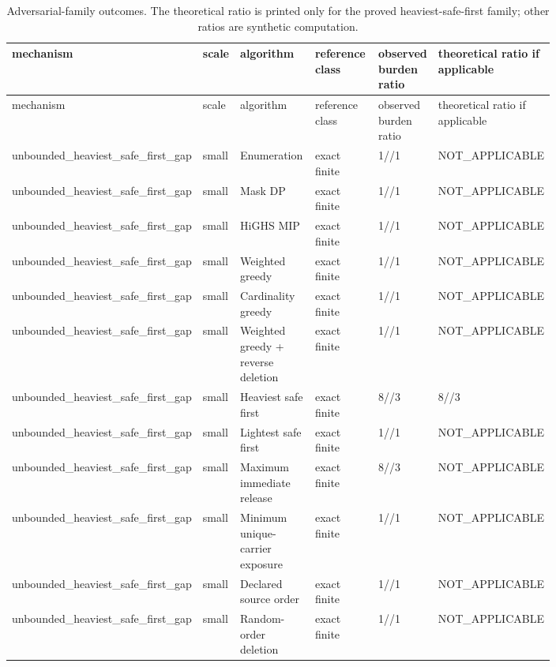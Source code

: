 {\footnotesize
\begin{longtable}{p{0.18\linewidth}p{0.07\linewidth}p{0.17\linewidth}p{0.16\linewidth}p{0.10\linewidth}p{0.12\linewidth}}
\caption{Adversarial-family outcomes. The theoretical ratio is printed only for the proved heaviest-safe-first family; other ratios are synthetic computation.}\label{tab:aor-adversarial-family}\\
\toprule
mechanism & scale & algorithm & reference class & observed burden ratio & theoretical ratio if applicable \\
\midrule
\endfirsthead
\toprule
mechanism & scale & algorithm & reference class & observed burden ratio & theoretical ratio if applicable \\
\midrule
\endhead
unbounded\_heaviest\_safe\_first\_gap & small & Enumeration & exact finite & 1//1 & NOT\_APPLICABLE \\
unbounded\_heaviest\_safe\_first\_gap & small & Mask DP & exact finite & 1//1 & NOT\_APPLICABLE \\
unbounded\_heaviest\_safe\_first\_gap & small & HiGHS MIP & exact finite & 1//1 & NOT\_APPLICABLE \\
unbounded\_heaviest\_safe\_first\_gap & small & Weighted greedy & exact finite & 1//1 & NOT\_APPLICABLE \\
unbounded\_heaviest\_safe\_first\_gap & small & Cardinality greedy & exact finite & 1//1 & NOT\_APPLICABLE \\
unbounded\_heaviest\_safe\_first\_gap & small & Weighted greedy + reverse deletion & exact finite & 1//1 & NOT\_APPLICABLE \\
unbounded\_heaviest\_safe\_first\_gap & small & Heaviest safe first & exact finite & 8//3 & 8//3 \\
unbounded\_heaviest\_safe\_first\_gap & small & Lightest safe first & exact finite & 1//1 & NOT\_APPLICABLE \\
unbounded\_heaviest\_safe\_first\_gap & small & Maximum immediate release & exact finite & 8//3 & NOT\_APPLICABLE \\
unbounded\_heaviest\_safe\_first\_gap & small & Minimum unique-carrier exposure & exact finite & 1//1 & NOT\_APPLICABLE \\
unbounded\_heaviest\_safe\_first\_gap & small & Declared source order & exact finite & 1//1 & NOT\_APPLICABLE \\
unbounded\_heaviest\_safe\_first\_gap & small & Random-order deletion & exact finite & 1//1 & NOT\_APPLICABLE \\

\end{longtable}}
